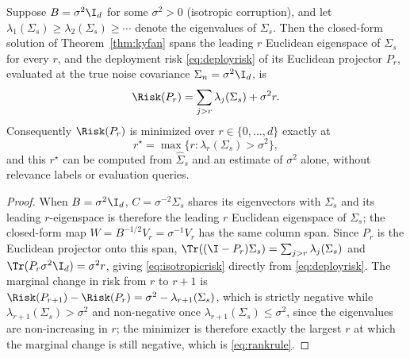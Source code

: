 \begin{proposition}
\label{prop:rankselection}
Suppose $B=\sigma^2\I_d$ for some $\sigma^2>0$ (isotropic corruption), and
let $\lambda_1(\Sigma_s)\ge\lambda_2(\Sigma_s)\ge\cdots$ denote the
eigenvalues of $\Sigma_s$. Then the closed-form solution of
Theorem~\ref{thm:kyfan} spans the leading $r$ Euclidean eigenspace of
$\Sigma_s$ for every $r$, and the deployment risk \cref{eq:deployrisk} of
its Euclidean projector $P_r$, evaluated at the true noise covariance
$\Sigma_n=\sigma^2\I_d$, is
\begin{equation}
 \Risk(P_r)=\sum_{j>r}\lambda_j(\Sigma_s)+\sigma^2r.
 \label{eq:isotropicrisk}
\end{equation}
Consequently $\Risk(P_r)$ is minimized over $r\in\{0,\dots,d\}$ exactly at
\begin{equation}
 r^\star=\max\{r:\lambda_r(\Sigma_s)>\sigma^2\},
 \label{eq:rankrule}
\end{equation}
and this $r^\star$ can be computed from $\widehat\Sigma_s$ and an estimate
of $\sigma^2$ alone, without relevance labels or evaluation queries.
\end{proposition}
\begin{proof}
When $B=\sigma^2\I_d$, $C=\sigma^{-2}\Sigma_s$ shares its eigenvectors with
$\Sigma_s$ and its leading $r$-eigenspace is therefore the leading $r$
Euclidean eigenspace of $\Sigma_s$; the closed-form map
$W=B^{-1/2}V_r=\sigma^{-1}V_r$ has the same column span. Since $P_r$ is the
Euclidean projector onto this span, $\Tr((\I-P_r)\Sigma_s)=
\sum_{j>r}\lambda_j(\Sigma_s)$ and $\Tr(P_r\sigma^2\I_d)=\sigma^2r$,
giving \cref{eq:isotropicrisk} directly from \cref{eq:deployrisk}. The
marginal change in risk from $r$ to $r+1$ is
$\Risk(P_{r+1})-\Risk(P_r)=\sigma^2-\lambda_{r+1}(\Sigma_s)$, which is
strictly negative while $\lambda_{r+1}(\Sigma_s)>\sigma^2$ and
non-negative once $\lambda_{r+1}(\Sigma_s)\le\sigma^2$, since the
eigenvalues are non-increasing in $r$; the minimizer is therefore exactly
the largest $r$ at which the marginal change is still negative, which is
\cref{eq:rankrule}.
\end{proof}

